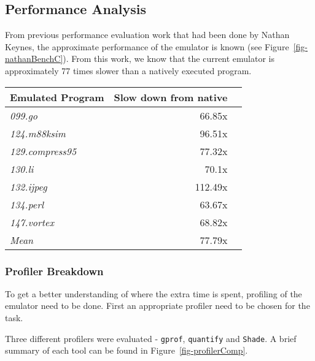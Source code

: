 \subsection{Performance Analysis}

From previous performance evaluation work that had been done by Nathan Keynes, 
the approximate performance of the emulator is known 
(see Figure~\ref{fig-nathanBenchC}). 
From this work, we know that the current emulator is approximately 77 times 
slower than a natively executed program.

\centerfigbegin
{
\begin{tabular}{|l|r|r|} \hline
Emulated Program & Slow down from native\\ \hline
\emph{099.go} &66.85x  \\ 
\emph{124.m88ksim} &96.51x\\
\emph{129.compress95} &77.32x\\
\emph{130.li} & 70.1x\\
\emph{132.ijpeg} & 112.49x\\
\emph{134.perl}  & 63.67x \\
\emph{147.vortex} &68.82x\\ \hline
\emph{Mean} & 77.79x \\
\hline
\end{tabular}
}


\subsubsection{Profiler Breakdown}

To get a better understanding of where the extra time is spent, profiling
of the emulator need to be done. First an appropriate profiler need to be
chosen for the task.

Three different profilers were evaluated - \verb!gprof!, \verb!quantify! and
\verb!Shade!. A brief summary of each tool can be found in 
Figure~\ref{fig-profilerComp}.

